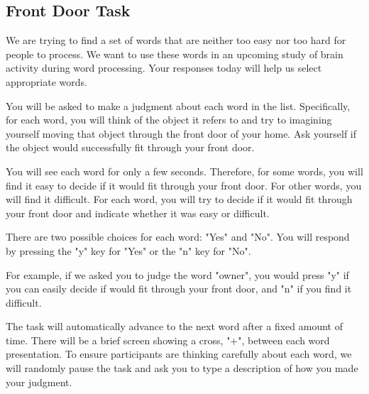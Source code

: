 \documentclass[man,natbib,floatsintext]{apa6} %
\begin{document}
\subsection{Front Door Task}
\begin{displayquote}
We are trying to find a set of words that are neither too easy nor too hard for people to process. We want to use these words in an upcoming study of brain activity during word processing. Your responses today will help us select appropriate words.

You will be asked to make a judgment about each word in the list. Specifically, for each word, you will think of the object it refers to and try to imagining yourself moving that object through the front door of your home. Ask yourself if the object would successfully fit through your front door.

You will see each word for only a few seconds. Therefore, for some words, you will find it easy to decide if it would fit through your front door. For other words, you will find it difficult. For each word, you will try to decide if it would fit through your front door and indicate whether it was easy or difficult.

There are two possible choices for each word: "Yes" and "No". You will respond by pressing the "y" key for "Yes" or the "n" key for "No".

For example, if we asked you to judge the word "owner", you would press "y" if you can easily decide if would fit through your front door, and "n" if you find it difficult.

The task will automatically advance to the next word after a fixed amount of time. There will be a brief screen showing a cross, "+", between each word presentation.
To ensure participants are thinking carefully about each word, we will randomly pause the task and ask you to type a description of how you made your judgment.
\end{displayquote}
\end{document}
